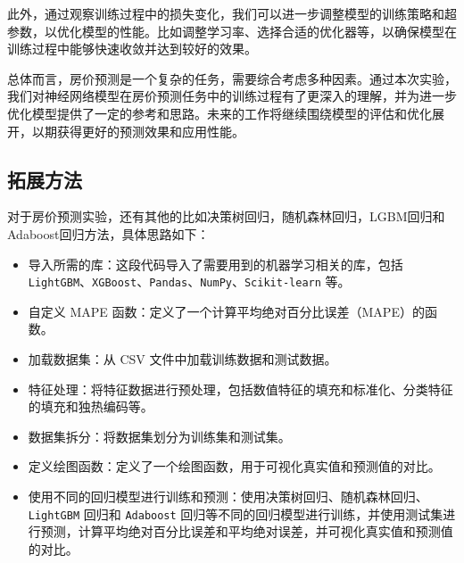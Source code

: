 \documentclass[a4paper,12pt]{article}
\begin{document}
此外，通过观察训练过程中的损失变化，我们可以进一步调整模型的训练策略和超参数，以优化模型的性能。比如调整学习率、选择合适的优化器等，以确保模型在训练过程中能够快速收敛并达到较好的效果。

总体而言，房价预测是一个复杂的任务，需要综合考虑多种因素。通过本次实验，我们对神经网络模型在房价预测任务中的训练过程有了更深入的理解，并为进一步优化模型提供了一定的参考和思路。未来的工作将继续围绕模型的评估和优化展开，以期获得更好的预测效果和应用性能。

\subsection{拓展方法}
对于房价预测实验，还有其他的比如决策树回归，随机森林回归，LGBM回归和Adaboost回归方法，具体思路如下：

\begin{itemize}
    \item 导入所需的库：这段代码导入了需要用到的机器学习相关的库，包括 \texttt{LightGBM}、\texttt{XGBoost}、\texttt{Pandas}、\texttt{NumPy}、\texttt{Scikit-learn} 等。
    
    \item 自定义 MAPE 函数：定义了一个计算平均绝对百分比误差（MAPE）的函数。
    
    \item 加载数据集：从 CSV 文件中加载训练数据和测试数据。
    
    \item 特征处理：将特征数据进行预处理，包括数值特征的填充和标准化、分类特征的填充和独热编码等。
    
    \item 数据集拆分：将数据集划分为训练集和测试集。
    
    \item 定义绘图函数：定义了一个绘图函数，用于可视化真实值和预测值的对比。
    
    \item 使用不同的回归模型进行训练和预测：使用决策树回归、随机森林回归、\texttt{LightGBM} 回归和 \texttt{Adaboost} 回归等不同的回归模型进行训练，并使用测试集进行预测，计算平均绝对百分比误差和平均绝对误差，并可视化真实值和预测值的对比。
\end{itemize} 
\end{document}
